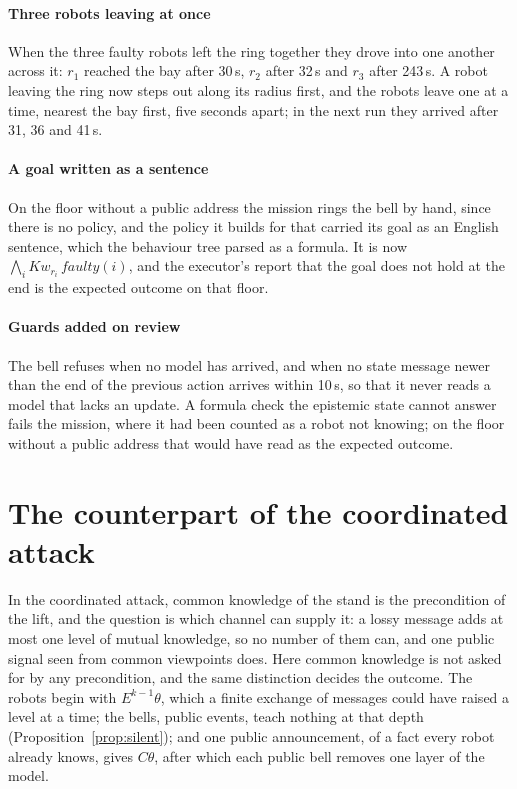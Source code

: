 \documentclass[11pt,a4paper]{article}
\theoremstyle{definition}
\newcommand{\Kw}[1]{\mathit{Kw}_{#1}}
\newcommand{\faulty}{\mathit{faulty}}
\newcommand{\some}{\theta}
\begin{document}
\paragraph{Three robots leaving at once} When the three faulty robots left the
ring together they drove into one another across it: $r_1$ reached the bay
after 30\,s, $r_2$ after 32\,s and $r_3$ after 243\,s. A robot leaving the ring
now steps out along its radius first, and the robots leave one at a time,
nearest the bay first, five seconds apart; in the next run they arrived after
31, 36 and 41\,s.

\paragraph{A goal written as a sentence} On the floor without a public address
the mission rings the bell by hand, since there is no policy, and the policy it
builds for that carried its goal as an English sentence, which the behaviour
tree parsed as a formula. It is now
$\bigwedge_i \Kw{r_i}\,\faulty(i)$, and the executor's report that the goal
does not hold at the end is the expected outcome on that floor.

\paragraph{Guards added on review} The bell refuses when no model has arrived,
and when no state message newer than the end of the previous action arrives
within 10\,s, so that it never reads a model that lacks an update. A formula
check the epistemic state cannot answer fails the mission, where it had been
counted as a robot not knowing; on the floor without a public address that
would have read as the expected outcome.

\section{The counterpart of the coordinated attack}
\label{sec:attack}

In the coordinated attack, common knowledge of the stand is the precondition
of the lift, and the question is which channel can supply it: a lossy message
adds at most one level of mutual knowledge, so no number of them can, and one
public signal seen from common viewpoints does. Here common knowledge is not
asked for by any precondition, and the same distinction decides the outcome. The
robots begin with $E^{k-1}\some$, which a finite exchange of messages could have
raised a level at a time; the bells, public events, teach nothing at that depth
(Proposition~\ref{prop:silent}); and one public announcement, of a fact every
robot already knows, gives $C\some$, after which each public bell removes one
layer of the model.
\end{document}
